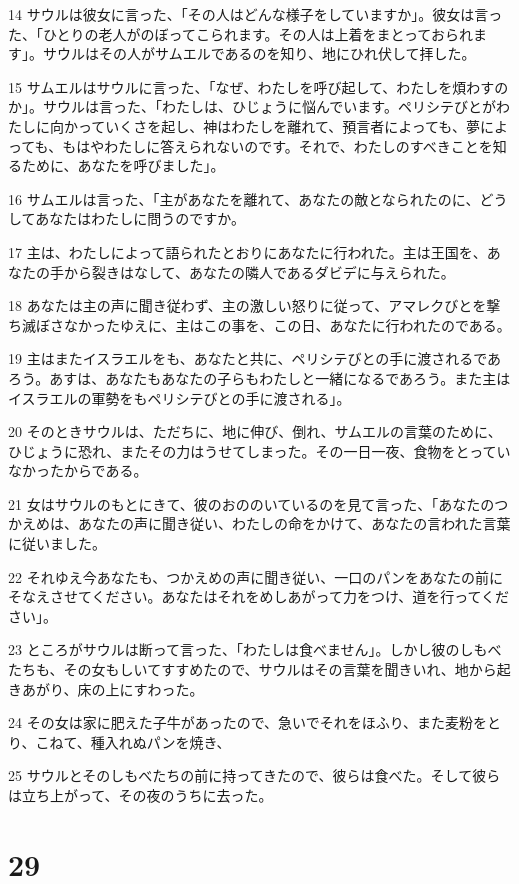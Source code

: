 \par 14 サウルは彼女に言った、「その人はどんな様子をしていますか」。彼女は言った、「ひとりの老人がのぼってこられます。その人は上着をまとっておられます」。サウルはその人がサムエルであるのを知り、地にひれ伏して拝した。
\par 15 サムエルはサウルに言った、「なぜ、わたしを呼び起して、わたしを煩わすのか」。サウルは言った、「わたしは、ひじょうに悩んでいます。ペリシテびとがわたしに向かっていくさを起し、神はわたしを離れて、預言者によっても、夢によっても、もはやわたしに答えられないのです。それで、わたしのすべきことを知るために、あなたを呼びました」。
\par 16 サムエルは言った、「主があなたを離れて、あなたの敵となられたのに、どうしてあなたはわたしに問うのですか。
\par 17 主は、わたしによって語られたとおりにあなたに行われた。主は王国を、あなたの手から裂きはなして、あなたの隣人であるダビデに与えられた。
\par 18 あなたは主の声に聞き従わず、主の激しい怒りに従って、アマレクびとを撃ち滅ぼさなかったゆえに、主はこの事を、この日、あなたに行われたのである。
\par 19 主はまたイスラエルをも、あなたと共に、ペリシテびとの手に渡されるであろう。あすは、あなたもあなたの子らもわたしと一緒になるであろう。また主はイスラエルの軍勢をもペリシテびとの手に渡される」。
\par 20 そのときサウルは、ただちに、地に伸び、倒れ、サムエルの言葉のために、ひじょうに恐れ、またその力はうせてしまった。その一日一夜、食物をとっていなかったからである。
\par 21 女はサウルのもとにきて、彼のおののいているのを見て言った、「あなたのつかえめは、あなたの声に聞き従い、わたしの命をかけて、あなたの言われた言葉に従いました。
\par 22 それゆえ今あなたも、つかえめの声に聞き従い、一口のパンをあなたの前にそなえさせてください。あなたはそれをめしあがって力をつけ、道を行ってください」。
\par 23 ところがサウルは断って言った、「わたしは食べません」。しかし彼のしもべたちも、その女もしいてすすめたので、サウルはその言葉を聞きいれ、地から起きあがり、床の上にすわった。
\par 24 その女は家に肥えた子牛があったので、急いでそれをほふり、また麦粉をとり、こねて、種入れぬパンを焼き、
\par 25 サウルとそのしもべたちの前に持ってきたので、彼らは食べた。そして彼らは立ち上がって、その夜のうちに去った。

\chapter{29}

